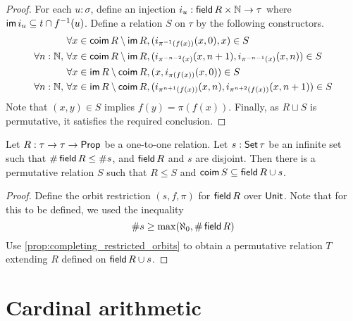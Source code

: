\begin{proof}
  \leanok
  For each \( u : \sigma \), define an injection \( i_u : \operatorname{\mathsf{field}} R \times \mathbb N \to \tau \) where \( \operatorname{\mathsf{im}} i_u \subseteq t \cap f^{-1}(u) \).
  Define a relation \( S \) on \( \tau \) by the following constructors.
  \begin{align*}
    \forall x \in \operatorname{\mathsf{coim}} R \setminus \operatorname{\mathsf{im}} R,\, &(i_{\pi^{-1}(f(x))}(x, 0), x) \in S \\
    \forall n : \mathbb N,\, \forall x \in \operatorname{\mathsf{coim}} R \setminus \operatorname{\mathsf{im}} R,\, &(i_{\pi^{-n-2}(x)}(x, n+1), i_{\pi^{-n-1}(x)}(x, n)) \in S \\
    \forall x \in \operatorname{\mathsf{im}} R \setminus \operatorname{\mathsf{coim}} R,\, &(x, i_{\pi(f(x))}(x, 0)) \in S \\
    \forall n : \mathbb N,\, \forall x \in \operatorname{\mathsf{im}} R \setminus \operatorname{\mathsf{coim}} R,\, &(i_{\pi^{n+1}(f(x))}(x, n), i_{\pi^{n+2}(f(x))}(x, n+1)) \in S
  \end{align*}
  Note that \( (x, y) \in S \) implies \( f(y) = \pi(f(x)) \).
  Finally, as \( R \sqcup S \) is permutative, it satisfies the required conclusion.
\end{proof}
\begin{proposition}
  \label{prop:completing_orbits}
  Let \( R : \tau \to \tau \to \mathsf{Prop} \) be a one-to-one relation.
  Let \( s : \operatorname{\mathsf{Set}} \tau \) be an infinite set such that \( \#\operatorname{\mathsf{field}} R \leq \#s \), and \( \operatorname{\mathsf{field}} R \) and \( s \) are disjoint.
  Then there is a permutative relation \( S \) such that \( R \leq S \) and \( \operatorname{\mathsf{coim}} S \subseteq \operatorname{\mathsf{field}} R \cup s \).
\end{proposition}
\begin{proof}
  Define the orbit restriction \( (s, f, \pi) \) for \( \operatorname{\mathsf{field}} R \) over \( \mathsf{Unit} \).
  Note that for this to be defined, we used the inequality
  \[ \#s \geq \max(\aleph_0, \#\operatorname{\mathsf{field}} R) \]
  Use \cref{prop:completing_restricted_orbits} to obtain a permutative relation \( T \) extending \( R \) defined on \( \operatorname{\mathsf{field}} R \cup s \).
\end{proof}

\section{Cardinal arithmetic}

